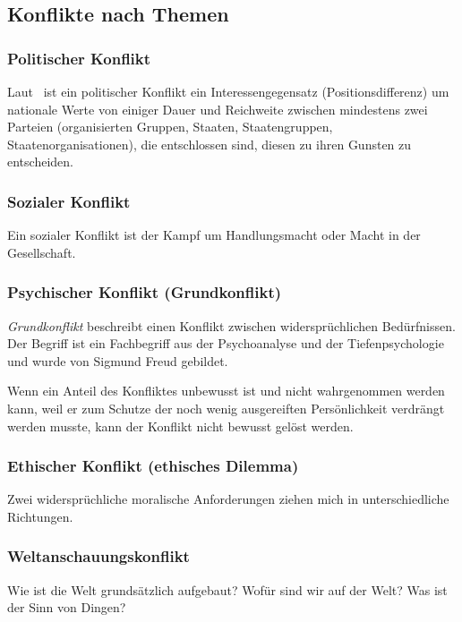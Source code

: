 \subsection{Konflikte nach Themen}

\subsubsection{Politischer Konflikt}

Laut~\cite{konfliktbarometer-2003} ist ein politischer Konflikt ein \glqq Interessengegensatz (Positionsdifferenz) um nationale Werte von einiger Dauer und Reichweite zwischen mindestens zwei Parteien (organisierten Gruppen, Staaten, Staatengruppen, Staatenorganisationen), die entschlossen sind, diesen zu ihren Gunsten zu entscheiden.\grqq

\subsubsection{Sozialer Konflikt}

Ein sozialer Konflikt ist der Kampf um Handlungsmacht oder Macht in der Gesellschaft.

\subsubsection{Psychischer Konflikt (Grundkonflikt)}

\emph{Grundkonflikt} beschreibt einen Konflikt zwischen widersprüchlichen Bedürfnissen. Der Begriff ist ein Fachbegriff aus der Psychoanalyse und der Tiefenpsychologie und wurde von Sigmund Freud gebildet.

Wenn ein Anteil des Konfliktes unbewusst ist und nicht wahrgenommen werden kann, weil er zum Schutze der noch wenig ausgereiften Persönlichkeit verdrängt werden musste, kann der Konflikt nicht bewusst gelöst werden.

\subsubsection{Ethischer Konflikt (ethisches Dilemma)}

Zwei widersprüchliche moralische Anforderungen ziehen mich in unterschiedliche Richtungen.

\subsubsection{Weltanschauungskonflikt}

Wie ist die Welt grundsätzlich aufgebaut? Wofür sind wir auf der Welt? Was ist der Sinn von Dingen?
